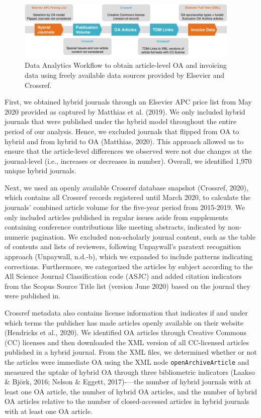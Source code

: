 \documentclass[a4paper,man,floatsintext,longtable,noextraspace,12pt]{apa6}
\begin{document}
\begin{figure}[H]

{\centering \includegraphics[width=0.95\textwidth]{../figure/els_flow.pdf}

}

\caption{Data Analytics Workflow to obtain article-level OA and invoicing data using freely available data sources provided by Elsevier and Crossref.
}\label{fig:workflow}
\end{figure}

First, we obtained hybrid journals through an Elsevier APC price list
from May 2020 provided as captured by Matthias et al. (2019). We only
included hybrid journals that were published under the hybrid model
throughout the entire period of our analysis. Hence, we excluded
journals that flipped from OA to hybrid and from hybrid to OA (Matthias,
2020). This approach allowed us to ensure that the article-level
differences we observed were not due changes at the journal-level (i.e.,
increases or decreases in number). Overall, we identified 1,970 unique
hybrid journals.

Next, we used an openly available Crossref database snapshot (Crossref,
2020), which contains all Crossref records registered until March 2020,
to calculate the journals' combined article volume for the five-year
period from 2015-2019. We only included articles published in regular
issues aside from supplements containing conference contributions like
meeting abstracts, indicated by non-numeric pagination. We excluded
non-scholarly journal content, such as the table of contents and lists
of reviewers, following Unpaywall's paratext recognition approach
(Unpaywall, n.d.-b), which we expanded to include patterns indicating
corrections. Furthermore, we categorized the articles by subject
according to the All Science Journal Classification code (ASJC) and
added citation indicators from the Scopus Source Title list (version
June 2020) based on the journal they were published in.

Crossref metadata also contains license information that indicates if
and under which terms the publisher has made articles openly available
on their website (Hendricks et al., 2020). We identified OA articles
through Creative Commons (CC) licenses and then downloaded the XML
version of all CC-licensed articles published in a hybrid journal. From
the XML files, we determined whether or not the articles were immediate
OA using the XML node \texttt{openArchiveArticle} and measured the
uptake of hybrid OA through three bibliometric indicators (Laakso \&
Björk, 2016; Nelson \& Eggett, 2017)-\/---the number of hybrid journals
with at least one OA article, the number of hybrid OA articles, and the
number of hybrid OA articles relative to the number of closed-accessed
articles in hybrid journals with at least one OA article.
\end{document}
